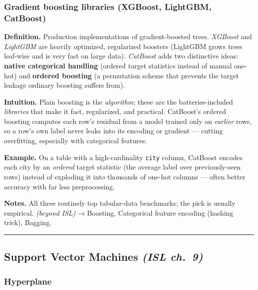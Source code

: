 \documentclass[
  10pt,
  letterpaper,
  onecolumn]{article}
\begin{document}
\hypertarget{gradient-boosting-libraries-xgboost-lightgbm-catboost}{%
\subsubsection{Gradient boosting libraries (XGBoost, LightGBM,
CatBoost)}\label{gradient-boosting-libraries-xgboost-lightgbm-catboost}}

\textbf{Definition.} Production implementations of gradient-boosted
trees. \emph{XGBoost} and \emph{LightGBM} are heavily optimized,
regularized boosters (LightGBM grows trees leaf-wise and is very fast on
large data). \emph{CatBoost} adds two distinctive ideas: \textbf{native
categorical handling} (ordered target statistics instead of manual
one-hot) and \textbf{ordered boosting} (a permutation scheme that
prevents the target leakage ordinary boosting suffers from).

\textbf{Intuition.} Plain boosting is the \emph{algorithm}; these are
the batteries-included \emph{libraries} that make it fast, regularized,
and practical. CatBoost's ordered boosting computes each row's residual
from a model trained only on \emph{earlier} rows, so a row's own label
never leaks into its encoding or gradient --- cutting overfitting,
especially with categorical features.

\textbf{Example.} On a table with a high-cardinality \texttt{city}
column, CatBoost encodes each city by an \emph{ordered} target statistic
(the average label over previously-seen rows) instead of exploding it
into thousands of one-hot columns --- often better accuracy with far
less preprocessing.

\textbf{Notes.} All three routinely top tabular-data benchmarks; the
pick is usually empirical. \emph{(beyond ISL)} → Boosting, Categorical
feature encoding (hashing trick), Bagging.

\begin{center}\rule{0.5\linewidth}{0.5pt}\end{center}

\hypertarget{support-vector-machines-isl-ch.-9}{%
\subsection{\texorpdfstring{Support Vector Machines \emph{(ISL
ch.~9)}}{Support Vector Machines (ISL ch.~9)}}\label{support-vector-machines-isl-ch.-9}}

\hypertarget{hyperplane}{%
\subsubsection{Hyperplane}\label{hyperplane}}
\end{document}
